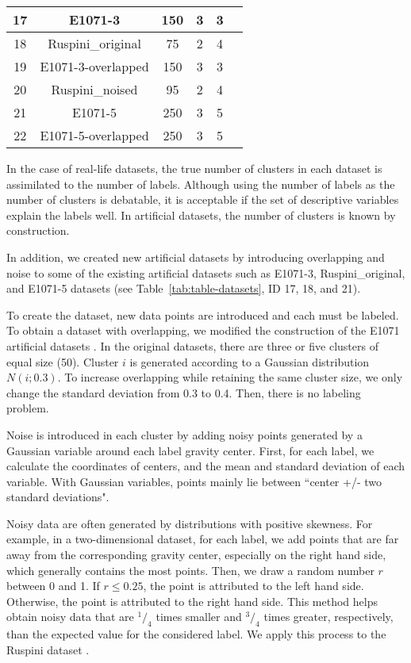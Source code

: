 \documentclass[runningheads,a4paper]{llncs}
\begin{document}
\begin{table*}
\begin{tabular}{|c|c|c|c|c|c|}
17 & E1071-3 & 150 & 3 & 3 & \cite{meyer2017package} \\ \hline
18 & Ruspini\_original & 75 & 2 & 4 & \cite{ruspini1970numerical} \\ \hline
19 & E1071-3-overlapped & 150 & 3 & 3 & \cite{meyer2017package} \\ \hline
20 & Ruspini\_noised & 95 & 2 & 4 & \cite{ruspini1970numerical} \\ \hline
21 & E1071-5 & 250 & 3 & 5 & \cite{meyer2017package} \\ \hline
22 & E1071-5-overlapped & 250 & 3 & 5 & \cite{meyer2017package} \\ \hline
\end{tabular}
\end{table*}

In the case of real-life datasets, the true number of clusters in each dataset is assimilated to the number of labels. Although using the number of labels as the number of clusters is debatable, it is acceptable if the set of descriptive variables explain the labels well. In artificial datasets, the number of clusters is known by construction.

In addition, we created new artificial datasets by introducing overlapping and noise to some of the existing artificial datasets such as E1071-3, Ruspini\_original, and E1071-5 datasets (see Table~\ref{tab:table-datasets}, ID 17, 18, and 21). 

To create the dataset, new data points are introduced and each must be labeled. To obtain a dataset with overlapping, we modified the construction of the E1071 artificial datasets \cite{meyer2017package}. In the original datasets, there are three or five clusters of equal size (50). Cluster $i$ is generated according to a Gaussian distribution $N(i; 0.3)$. To increase overlapping while retaining the same cluster size, we only change the standard deviation from 0.3 to 0.4. Then, there is no labeling problem.

Noise is introduced in each cluster by adding noisy points generated by a Gaussian variable around each label gravity center. First, for each label, we calculate the coordinates of centers, and the mean and standard deviation of each variable. With Gaussian variables, points mainly lie between ``center +/- two standard deviations". 

Noisy data are often generated by distributions with positive skewness. For example, in a two-dimensional dataset, for each label, we add points that are far away from the corresponding gravity center, especially on the right hand side, which generally contains the most points. Then, we draw a random number $r$ between 0 and 1. If $r \leq 0.25$, the point is attributed to the left hand side. Otherwise, the point is attributed to the right hand side. This method helps obtain noisy data that are $^1/_4$ times smaller and $^3/_4$ times greater, respectively, than the expected value for the considered label. We apply this process to the Ruspini dataset \cite{ruspini1970numerical}.
\end{document}
